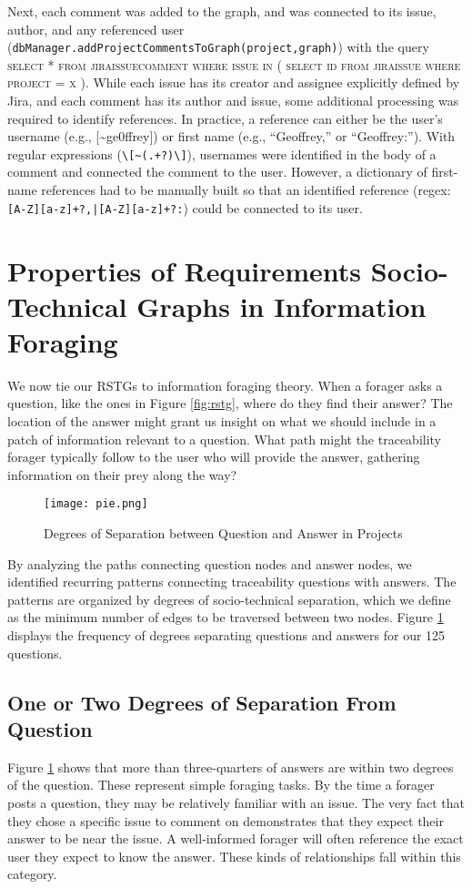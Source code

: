 Next, each comment was added to the graph, and was connected to its issue, author, and any referenced user (\texttt{dbManager.addProjectCommentsToGraph(project,graph)}) with the query \textsc{select * from jira\textunderscore issue\textunderscore comment where issue in ( select id from jira\textunderscore issue where project = x )}. While each issue has its creator and assignee explicitly defined by Jira, and each comment has its author and issue, some additional processing was required to identify references. In practice, a reference can either be the user's username (e.g., [\textasciitilde ge0ffrey]) or first name (e.g., ``Geoffrey,'' or ``Geoffrey:''). With regular expressions (\texttt{\textbackslash {[}\textasciitilde (.+?)\textbackslash {]}}), usernames were identified in the body of a comment and connected the comment to the user. However, a dictionary of first-name references had to be manually built so that an identified reference (regex: \texttt{{[}A-Z{]}{[}a-z{]}+?,|{[}A-Z{]}{[}a-z{]}+?:}) could be connected to its user. 

\section{Properties of Requirements Socio-Technical Graphs in Information Foraging}
We now tie our RSTGs to information foraging theory. When a forager asks a question, like the ones in Figure \ref{fig:rstg}, where do they find their answer? The location of the answer might grant us insight on what we should include in a patch of information relevant to a question. What path might the traceability forager typically follow to the user who will provide the answer, gathering information on their prey along the way?

\begin{figure}
	\centering
	\texttt{[image: pie.png]}
	\caption{Degrees of Separation between Question and Answer in Projects}
	\label{fig:pie}
\end{figure}

By analyzing the paths connecting question nodes and answer nodes, we identified recurring patterns connecting traceability questions with answers. The patterns are organized by degrees of socio-technical separation, which we define as the minimum number of edges to be traversed between two nodes. Figure \ref{fig:pie} displays the frequency of degrees separating questions and answers for our 125 questions. 

\subsection{One or Two Degrees of Separation From Question}
Figure \ref{fig:pie} shows that more than three-quarters of answers are within two degrees of the question. These represent simple foraging tasks. By the time a forager posts a question, they may be relatively familiar with an issue. The very fact that they chose a specific issue to comment on demonstrates that they expect their answer to be near the issue. A well-informed forager will often reference the exact user they expect to know the answer. These kinds of relationships fall within this category.

